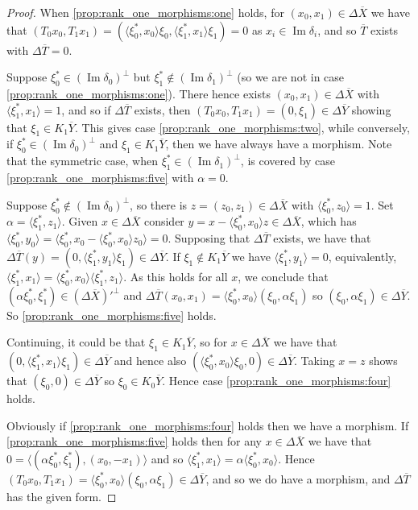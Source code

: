 \documentclass[a4paper,11pt]{article}
\theoremstyle{plain}
\theoremstyle{remark}
\newcommand{\ip}[2]{{\langle {#1} , {#2} \rangle}}
\newcommand{\im}{{\operatorname{Im}}}
\begin{document}
\begin{proof}
When \ref{prop:rank_one_morphisms:one} holds, for $(x_0, x_1)\in\Delta\overline X$ we have that $(T_0x_0, T_1x_1) = (\ip{\xi_0^*}{x_0}\xi_0, \ip{\xi_1^*}{x_1}\xi_1) = 0$ as $x_i \in \im\delta_i$, and so $\overline T$ exists with $\Delta\overline T = 0$.

Suppose $\xi_0^*\in(\im\delta_0)^\perp$ but $\xi_1^*\not\in(\im\delta_1)^\perp$ (so we are not in case \ref{prop:rank_one_morphisms:one}).  There hence exists $(x_0,x_1)\in\Delta\overline X$ with $\ip{\xi_1^*}{x_1}=1$, and so if $\Delta\overline T$ exists, then $(T_0x_0, T_1x_1) = (0, \xi_1) \in \Delta\overline Y$ showing that $\xi_1\in K_1\overline Y$.  This gives case \ref{prop:rank_one_morphisms:two}, while conversely, if $\xi_0^*\in(\im\delta_0)^\perp$ and $\xi_1\in K_1\overline Y$, then we have always have a morphism.  Note that the symmetric case, when $\xi_1^*\in(\im\delta_1)^\perp$, is covered by case \ref{prop:rank_one_morphisms:five} with $\alpha=0$.

Suppose $\xi_0^*\not\in(\im\delta_0)^\perp$, so there is $z=(z_0,z_1)\in \Delta\overline X$ with $\ip{\xi_0^*}{z_0} = 1$.  Set $\alpha = \ip{\xi_1^*}{z_1}$.  Given $x\in\Delta\overline X$ consider $y = x - \ip{\xi_0^*}{x_0}z \in \Delta\overline X$, which has $\ip{\xi_0^*}{y_0} = \ip{\xi_0^*}{x_0 - \ip{\xi_0^*}{x_0}z_0} = 0$.  Supposing that $\Delta\overline T$ exists, we have that $\Delta\overline T(y) = (0, \ip{\xi_1^*}{y_1}\xi_1) \in \Delta\overline Y$.  If $\xi_1\not\in K_1\overline Y$ we have $\ip{\xi_1^*}{y_1} = 0$, equivalently, $\ip{\xi_1^*}{x_1} = \ip{\xi_0^*}{x_0}\ip{\xi_1^*}{z_1}$.  As this holds for all $x$, we conclude that $(\alpha\xi_0^*, \xi_1^*) \in (\Delta\overline X)'^\perp$ and $\Delta\overline T(x_0,x_1) = \ip{\xi_0^*}{x_0} (\xi_0, \alpha \xi_1)$ so $(\xi_0, \alpha \xi_1) \in \Delta\overline Y$.  So \ref{prop:rank_one_morphisms:five} holds.

Continuing, it could be that $\xi_1 \in K_1\overline Y$, so for $x\in\Delta\overline X$ we have that $(0, \ip{\xi_1^*}{x_1}\xi_1) \in \Delta\overline Y$ and hence also $(\ip{\xi_0^*}{x_0}\xi_0, 0) \in \Delta\overline Y$.  Taking $x=z$ shows that $(\xi_0,0) \in \Delta\overline Y$ so $\xi_0\in K_0\overline Y$.  Hence case \ref{prop:rank_one_morphisms:four} holds.

Obviously if \ref{prop:rank_one_morphisms:four} holds then we have a morphism.  If \ref{prop:rank_one_morphisms:five} holds then for any $x\in\Delta\overline X$ we have that $0 = \ip{(\alpha\xi_0^*, \xi_1^*)}{(x_0, -x_1)}$ and so $\ip{\xi_1^*}{x_1} = \alpha \ip{\xi_0^*}{x_0}$.  Hence $(T_0x_0, T_1x_1) = \ip{\xi_0^*}{x_0} (\xi_0, \alpha \xi_1) \in \Delta\overline Y$, and so we do have a morphism, and $\Delta\overline T$ has the given form.
\end{proof}
\end{document}
